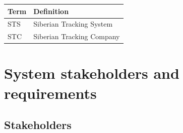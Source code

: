 \documentclass[a4paper,11pt]{report}
\begin{document}
\begin{center}
  \begin{tabular}[h!]{| p{} | p{} |}
    \hline
    \rowcolor{gray}
    Term & Definition \\
    \hline
    \hline
    STS & Siberian Tracking System \\\hline
    STC & Siberian Tracking Company \\\hline
  \end{tabular}
\end{center}

\chapter{System stakeholders and requirements}
\label{cha:syst-stak-requ}
\thispagestyle{fancy}

\section{Stakeholders}
\label{sec:stakeholders}
\end{document}

